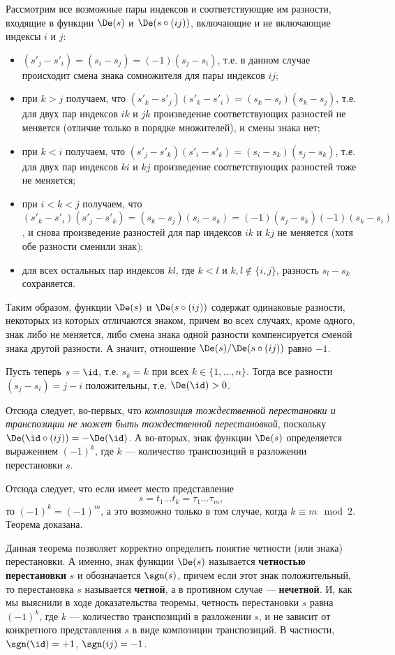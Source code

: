 \begin{enumerate}
Рассмотрим все возможные пары индексов и соответствующие им разности, входящие в функции $\De(s)$ и $\De(s\circ(ij))$, включающие и не включающие индексы $i$ и $j$:
\begin{itemize}
\item $(s'_j-s'_i)=(s_i-s_j)=(-1)(s_j-s_i)$, т.е. в данном случае происходит смена знака сомножителя для пары индексов $ij$;
\item при $k>j$ получаем, что $(s'_k-s'_j)(s'_k-s'_i)=(s_k-s_i)(s_k-s_j)$, т.е. для двух пар индексов $ik$ и $jk$ произведение соответствующих разностей не меняется (отличие только в порядке множителей), и смены знака нет;
\item при $k<i$ получаем, что $(s'_j-s'_k)(s'_i-s'_k)=(s_i-s_k)(s_j-s_k)$, т.е. для двух пар индексов $ki$ и $kj$ произведение соответствующих разностей тоже не меняется;
\item при $i<k<j$ получаем, что $(s'_k-s'_i)(s'_j-s'_k)=(s_k-s_j)(s_i-s_k)=(-1)(s_j-s_k)(-1)(s_k-s_i)$, и снова произведение разностей для пар индексов $ik$ и $kj$ не меняется (хотя обе разности сменили знак);
\item для всех остальных пар индексов $kl$, где $k<l$ и $k,l\notin\{i,j\}$, разность $s_l-s_k$ сохраняется.
\end{itemize}
Таким образом, функции $\De(s)$ и $\De(s\circ(ij))$ содержат одинаковые разности, некоторых из которых отличаются знаком, причем во всех случаях, кроме одного, знак либо не меняется, либо смена знака одной разности компенсируется сменой знака другой разности. А значит, отношение $\De(s)/\De(s\circ(ij))$ равно $-1$.

Пусть теперь $s=\id$, т.е. $s_k=k$ при всех $k\in\{1,\dots,n\}$. Тогда все разности $(s_j-s_i)=j-i$ положительны, т.е. $\De(\id)>0$.

Отсюда следует, во-первых, что \textit{композиция тождественной перестановки и транспозиции не может быть тождественной перестановкой}, поскольку $\De(\id\circ(ij))=-\De(\id)$. А во-вторых, знак функции $\De(s)$ определяется выражением $(-1)^k$, где $k$ --- количество транспозиций в разложении перестановки $s$.

Отсюда следует, что если имеет место представление
$$
s=t_1\dots t_k=\tau_1\dots\tau_m,
$$
то $(-1)^k=(-1)^m$, а это возможно только в том случае, когда $k\equiv m\mod 2$. Теорема доказана.
\epf

Данная теорема позволяет корректно определить понятие четности (или знака) перестановки. А именно, знак функции $\De(s)$ называется \textbf{четностью перестановки} $s$ и обозначается $\sgn(s)$, причем если этот знак положительный, то перестановка $s$ называется \textbf{четной}, а в противном случае --- \textbf{нечетной}. И, как мы выяснили в ходе доказательства теоремы, четность перестановки $s$ равна $(-1)^k$, где $k$ --- количество транспозиций в разложении $s$, и не зависит от конкретного представления $s$ в виде композиции транспозиций. В частности, $\sgn(\id)=+1$, $\sgn(ij)=-1$. 


\end{enumerate}
